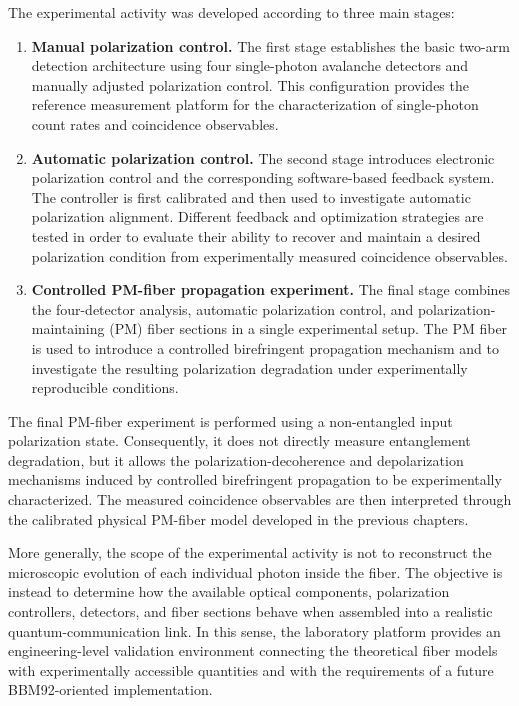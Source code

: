 The experimental activity was developed according to three main stages:

\begin{enumerate}
    \item \textbf{Manual polarization control.}
    The first stage establishes the basic two-arm detection architecture using
    four single-photon avalanche detectors and manually adjusted polarization
    control. This configuration provides the reference measurement platform for
    the characterization of single-photon count rates and coincidence
    observables.

    \item \textbf{Automatic polarization control.}
    The second stage introduces electronic polarization control and
    the corresponding software-based feedback system. The controller is first
    calibrated and then used to investigate automatic polarization alignment.
    Different feedback and optimization strategies are tested in order to
    evaluate their ability to recover and maintain a desired polarization
    condition from experimentally measured coincidence observables.

    \item \textbf{Controlled PM-fiber propagation experiment.}
    The final stage combines the four-detector analysis, automatic polarization
    control, and polarization-maintaining (PM) fiber sections in a single
    experimental setup. The PM fiber is used to introduce a controlled
    birefringent propagation mechanism and to investigate the resulting
    polarization degradation under experimentally reproducible conditions.
\end{enumerate}

The final PM-fiber experiment is performed using a non-entangled input polarization state. 
Consequently, it does not directly measure entanglement degradation, 
but it allows the polarization-decoherence and depolarization mechanisms 
induced by controlled birefringent propagation to be experimentally characterized.
The measured coincidence observables are then interpreted
through the calibrated physical PM-fiber model developed in the previous
chapters.

More generally, the scope of the experimental activity is not to reconstruct the
microscopic evolution of each individual photon inside the fiber. The objective
is instead to determine how the available optical components, polarization
controllers, detectors, and fiber sections behave when assembled into a realistic
quantum-communication link. In this sense, the laboratory platform provides an
engineering-level validation environment connecting the theoretical fiber models
with experimentally accessible quantities and with the requirements of a future
BBM92-oriented implementation.

